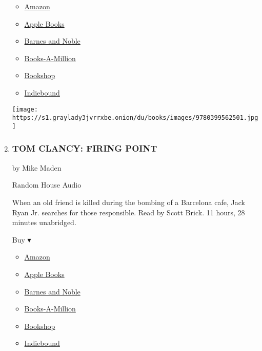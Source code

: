\begin{enumerate}
  \begin{itemize}
  \tightlist
  \item
    \href{https://www.amazon.com/Giver-Stars-Novel-Jojo-Moyes/dp/0399562486?tag=NYTBS-20}{Amazon}
  \item
    \href{https://du-gae-books-dot-nyt-du-prd.appspot.com/buy?title=THE+GIVER+OF+STARS\&author=Jojo+Moyes}{Apple
    Books}
  \item
    \href{https://www.anrdoezrs.net/click-7990613-11819508?url=https\%3A\%2F\%2Fwww.barnesandnoble.com\%2Fw\%2F\%3Fean\%3D9780525530206}{Barnes
    and Noble}
  \item
    \href{https://www.anrdoezrs.net/click-7990613-35140?url=https\%3A\%2F\%2Fwww.booksamillion.com\%2Fp\%2FTHE\%2BGIVER\%2BOF\%2BSTARS\%2FJojo\%2BMoyes\%2F9780525530206}{Books-A-Million}
  \item
    \href{https://bookshop.org/a/3546/9780525530206}{Bookshop}
  \item
    \href{https://www.indiebound.org/book/9780525530206?aff=NYT}{Indiebound}
  \end{itemize}

  \texttt{[image: https://s1.graylady3jvrrxbe.onion/du/books/images/9780399562501.jpg]}
\item
  \hypertarget{tom-clancy-firing-point}{%
  \subsubsection{TOM CLANCY: FIRING
  POINT}\label{tom-clancy-firing-point}}

  by Mike Maden

  Random House Audio

  When an old friend is killed during the bombing of a Barcelona cafe,
  Jack Ryan Jr. searches for those responsible. Read by Scott Brick. 11
  hours, 28 minutes unabridged.

  Buy ▾

  \begin{itemize}
  \tightlist
  \item
    \href{https://www.amazon.com/dp/0593188063?tag=NYTBSREV-20\&tag=NYTBS-20}{Amazon}
  \item
    \href{https://du-gae-books-dot-nyt-du-prd.appspot.com/buy?title=TOM+CLANCY\%3A+FIRING+POINT\&author=Mike+Maden}{Apple
    Books}
  \item
    \href{https://www.anrdoezrs.net/click-7990613-11819508?url=https\%3A\%2F\%2Fwww.barnesandnoble.com\%2Fw\%2F\%3Fean\%3D9780593216224}{Barnes
    and Noble}
  \item
    \href{https://www.anrdoezrs.net/click-7990613-35140?url=https\%3A\%2F\%2Fwww.booksamillion.com\%2Fp\%2FTOM\%2BCLANCY\%253A\%2BFIRING\%2BPOINT\%2FMike\%2BMaden\%2F9780593216224}{Books-A-Million}
  \item
    \href{https://bookshop.org/a/3546/9780593216224}{Bookshop}
  \item
    \href{https://www.indiebound.org/book/9780593216224?aff=NYT}{Indiebound}
  \end{itemize}


\end{enumerate}
